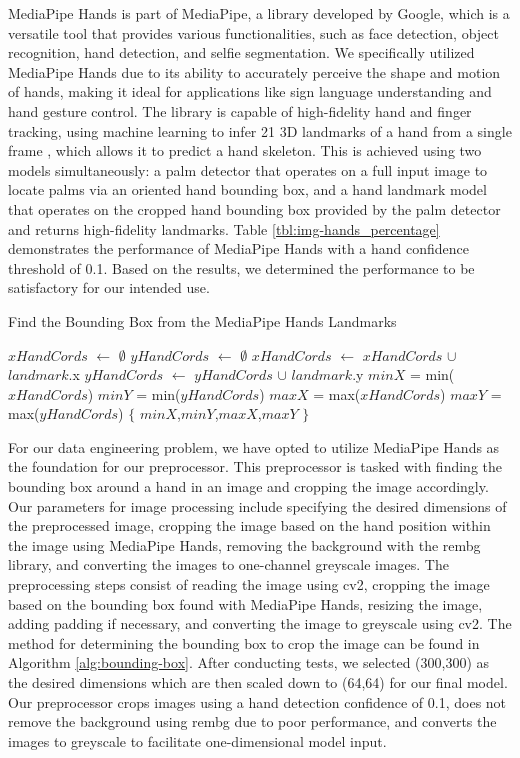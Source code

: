 \documentclass[a4paper]{article}
\begin{document}
MediaPipe Hands is part of MediaPipe, a library developed by Google, which is a versatile tool that provides various functionalities, such as face detection, object recognition, hand detection, and selfie segmentation. We specifically utilized MediaPipe Hands due to its ability to accurately perceive the shape and motion of hands, making it ideal for applications like sign language understanding and hand gesture control. The library is capable of high-fidelity hand and finger tracking, using machine learning to infer 21 3D landmarks of a hand from a single frame \cite{mediapipe}, which allows it to predict a hand skeleton. This is achieved using two models simultaneously: a palm detector that operates on a full input image to locate palms via an oriented hand bounding box, and a hand landmark model that operates on the cropped hand bounding box provided by the palm detector and returns high-fidelity landmarks. Table \ref{tbl:img-hands_percentage} demonstrates the performance of MediaPipe Hands with a hand confidence threshold of 0.1. Based on the results, we determined the performance to be satisfactory for our intended use.

\begin{algorithm}
	\caption{Find the Bounding Box from the MediaPipe Hands Landmarks} 
	\label{alg:bounding-box}
	\begin{algorithmic}[1]
	\State $xHandCords$ $\gets$ $\emptyset$
	\State $yHandCords$ $\gets$ $\emptyset$
			\State $xHandCords$ $\gets$ $xHandCords$ $\cup$ $landmark$.x
			\State $yHandCords$ $\gets$ $yHandCords$ $\cup$ $landmark$.y
		\EndFor
		\State $minX$ = min($xHandCords$)
		\State $minY$ = min($yHandCords$)
		\State $maxX$ = max($xHandCords$)
		\State $maxY$ = max($yHandCords$)
		\State \Return $\{$ $minX$,$minY$,$maxX$,$maxY$ $\}$
	\end{algorithmic} 
\end{algorithm}


For our data engineering problem, we have opted to utilize MediaPipe Hands as the foundation for our preprocessor. This preprocessor is tasked with finding the bounding box around a hand in an image and cropping the image accordingly. Our parameters for image processing include specifying the desired dimensions of the preprocessed image, cropping the image based on the hand position within the image using MediaPipe Hands, removing the background with the rembg library, and converting the images to one-channel greyscale images. The preprocessing steps consist of reading the image using cv2, cropping the image based on the bounding box found with MediaPipe Hands, resizing the image, adding padding if necessary, and converting the image to greyscale using cv2. The method for determining the bounding box to crop the image can be found in Algorithm \ref{alg:bounding-box}. After conducting tests, we selected (300,300) as the desired dimensions which are then scaled down to (64,64) for our final model. Our preprocessor crops images using a hand detection confidence of 0.1, does not remove the background using rembg due to poor performance, and converts the images to greyscale to facilitate one-dimensional model input.
\end{document}
